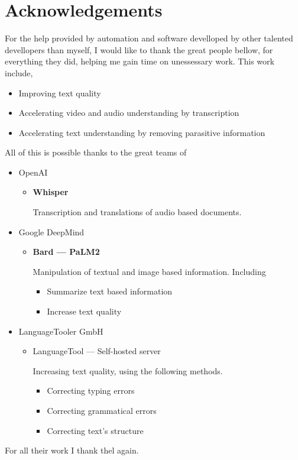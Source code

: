 \pagebreak
\section*{Acknowledgements}

For the help provided by automation and software develloped by other talented devellopers than myself, I would like to thank the great people bellow, for everything they did, helping me gain time on unessessary work.
This work include,
\begin{itemize}
  \item Improving text quality
  \item Accelerating video and audio understanding by transcription
  \item Accelerating text understanding by removing parasitive information
\end{itemize}

All of this is possible thanks to the great teams of 
\begin{itemize}
  \item OpenAI
  \begin{itemize}
    \item \Large \textbf{Whisper} 
    
    Transcription and translations of audio based documents.
  \end{itemize}
  \item Google DeepMind
  \begin{itemize}
    \item \Large \textbf{Bard — PaLM2}
    
    Manipulation of textual and image based information. Including 
    \begin{itemize}
      \item Summarize text based information
      \item Increase text quality
    \end{itemize}
  \end{itemize}
  \item LanguageTooler GmbH
  \begin{itemize}
    \item LanguageTool — Self-hosted server
    
    Increasing text quality, using the following methods.
    \begin{itemize}
      \item Correcting typing errors
      \item Correcting grammatical errors
      \item Correcting text's structure
    \end{itemize}
  \end{itemize}
\end{itemize}

For all their work I thank thel again.